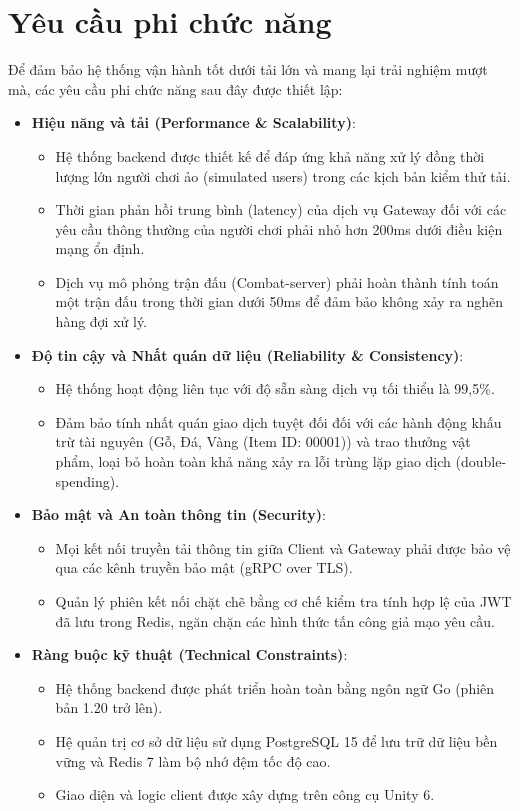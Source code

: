 \documentclass[../Project.tex]{subfiles}
\begin{document}
\section{Yêu cầu phi chức năng}
Để đảm bảo hệ thống vận hành tốt dưới tải lớn và mang lại trải nghiệm mượt mà, các yêu cầu phi chức năng sau đây được thiết lập:

\begin{itemize}
    \item \textbf{Hiệu năng và tải (Performance \& Scalability)}:
    \begin{itemize}
        \item Hệ thống backend được thiết kế để đáp ứng khả năng xử lý đồng thời lượng lớn người chơi ảo (simulated users) trong các kịch bản kiểm thử tải.
        \item Thời gian phản hồi trung bình (latency) của dịch vụ Gateway đối với các yêu cầu thông thường của người chơi phải nhỏ hơn 200ms dưới điều kiện mạng ổn định.
        \item Dịch vụ mô phỏng trận đấu (Combat-server) phải hoàn thành tính toán một trận đấu trong thời gian dưới 50ms để đảm bảo không xảy ra nghẽn hàng đợi xử lý.
    \end{itemize}
    \item \textbf{Độ tin cậy và Nhất quán dữ liệu (Reliability \& Consistency)}:
    \begin{itemize}
        \item Hệ thống hoạt động liên tục với độ sẵn sàng dịch vụ tối thiểu là 99,5\%.
        \item Đảm bảo tính nhất quán giao dịch tuyệt đối đối với các hành động khấu trừ tài nguyên (Gỗ, Đá, Vàng (Item ID: 00001)) và trao thưởng vật phẩm, loại bỏ hoàn toàn khả năng xảy ra lỗi trùng lặp giao dịch (double-spending).
    \end{itemize}
    \item \textbf{Bảo mật và An toàn thông tin (Security)}:
    \begin{itemize}
        \item Mọi kết nối truyền tải thông tin giữa Client và Gateway phải được bảo vệ qua các kênh truyền bảo mật (gRPC over TLS).
        \item Quản lý phiên kết nối chặt chẽ bằng cơ chế kiểm tra tính hợp lệ của JWT đã lưu trong Redis, ngăn chặn các hình thức tấn công giả mạo yêu cầu.
    \end{itemize}
    \item \textbf{Ràng buộc kỹ thuật (Technical Constraints)}:
    \begin{itemize}
        \item Hệ thống backend được phát triển hoàn toàn bằng ngôn ngữ Go (phiên bản 1.20 trở lên).
        \item Hệ quản trị cơ sở dữ liệu sử dụng PostgreSQL 15 để lưu trữ dữ liệu bền vững và Redis 7 làm bộ nhớ đệm tốc độ cao.
        \item Giao diện và logic client được xây dựng trên công cụ Unity 6.
    \end{itemize}
\end{itemize}
\end{document}
